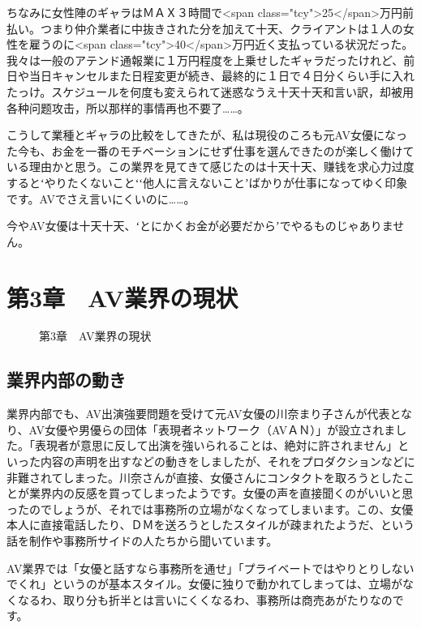 \documentclass[12pt,UTF8]{ctexbook}
\begin{document}
ちなみに女性陣のギャラはＭＡＸ３時間で<span class="tcy">25</span>万円前払い。つまり仲介業者に中抜きされた分を加えて十天、クライアントは１人の女性を雇うのに<span class="tcy">40</span>万円近く支払っている状況だった。我々は一般のアテンド通報業に１万円程度を上乗せしたギャラだったけれど、前日や当日キャンセルまた日程変更が続き、最終的に１日で４日分くらい手に入れたっけ。スケジュールを何度も変えられて迷惑なうえ十天十天和言い訳，却被用各种问题攻击，所以那样的事情再也不要了……。

こうして業種とギャラの比較をしてきたが、私は現役のころも元AV女優になった今も、お金を一番のモチベーションにせず仕事を選んできたのが楽しく働けている理由かと思う。この業界を見てきて感じたのは十天十天、赚钱を求心力过度するとʻやりたくないことʻʻ他人に言えないことʼばかりが仕事になってゆく印象です。AVでさえ言いにくいのに……。

今やAV女優は十天十天、ʻとにかくお金が必要だからʼでやるものじゃありません。

\switchcolumn

\chapter{第3章　AV業界の現状}

\begin{figure}[htbp]
    \centering
    \caption{第3章　AV業界の現状}
    \label{fig:chapter3}
\end{figure}

\section{業界内部の動き}

業界内部でも、AV出演強要問題を受けて元AV女優の川奈まり子さんが代表となり、AV女優や男優らの団体「表現者ネットワーク（AVＡＮ）」が設立されました。「表現者が意思に反して出演を強いられることは、絶対に許されません」といった内容の声明を出すなどの動きをしましたが、それをプロダクションなどに非難されてしまった。川奈さんが直接、女優さんにコンタクトを取ろうとしたことが業界内の反感を買ってしまったようです。女優の声を直接聞くのがいいと思ったのでしょうが、それでは事務所の立場がなくなってしまいます。この、女優本人に直接電話したり、ＤＭを送ろうとしたスタイルが疎まれたようだ、という話を制作や事務所サイドの人たちから聞いています。

AV業界では「女優と話すなら事務所を通せ」「プライベートではやりとりしないでくれ」というのが基本スタイル。女優に独りで動かれてしまっては、立場がなくなるわ、取り分も折半とは言いにくくなるわ、事務所は商売あがたりなのです。
\end{document}

